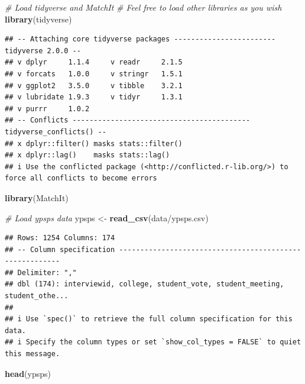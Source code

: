 \documentclass[
]{article}
\newenvironment{Shaded}{\begin{snugshade}}{\end{snugshade}}
\newcommand{\CommentTok}[1]{\textcolor[rgb]{0.56,0.35,0.01}{\textit{#1}}}
\newcommand{\FunctionTok}[1]{\textcolor[rgb]{0.13,0.29,0.53}{\textbf{#1}}}
\newcommand{\NormalTok}[1]{#1}
\newcommand{\OtherTok}[1]{\textcolor[rgb]{0.56,0.35,0.01}{#1}}
\newcommand{\StringTok}[1]{\textcolor[rgb]{0.31,0.60,0.02}{#1}}
\begin{document}
\begin{Shaded}
\begin{Highlighting}[]
\CommentTok{\# Load tidyverse and MatchIt}
\CommentTok{\# Feel free to load other libraries as you wish}
\FunctionTok{library}\NormalTok{(tidyverse)}
\end{Highlighting}
\end{Shaded}

\begin{verbatim}
## -- Attaching core tidyverse packages ------------------------ tidyverse 2.0.0 --
## v dplyr     1.1.4     v readr     2.1.5
## v forcats   1.0.0     v stringr   1.5.1
## v ggplot2   3.5.0     v tibble    3.2.1
## v lubridate 1.9.3     v tidyr     1.3.1
## v purrr     1.0.2     
## -- Conflicts ------------------------------------------ tidyverse_conflicts() --
## x dplyr::filter() masks stats::filter()
## x dplyr::lag()    masks stats::lag()
## i Use the conflicted package (<http://conflicted.r-lib.org/>) to force all conflicts to become errors
\end{verbatim}

\begin{Shaded}
\begin{Highlighting}[]
\FunctionTok{library}\NormalTok{(MatchIt)}


\CommentTok{\# Load ypsps data}
\NormalTok{ypsps }\OtherTok{\textless{}{-}} \FunctionTok{read\_csv}\NormalTok{(}\StringTok{\textquotesingle{}data/ypsps.csv\textquotesingle{}}\NormalTok{)}
\end{Highlighting}
\end{Shaded}

\begin{verbatim}
## Rows: 1254 Columns: 174
## -- Column specification --------------------------------------------------------
## Delimiter: ","
## dbl (174): interviewid, college, student_vote, student_meeting, student_othe...
## 
## i Use `spec()` to retrieve the full column specification for this data.
## i Specify the column types or set `show_col_types = FALSE` to quiet this message.
\end{verbatim}

\begin{Shaded}
\begin{Highlighting}[]
\FunctionTok{head}\NormalTok{(ypsps)}
\end{Highlighting}
\end{Shaded}
\end{document}
